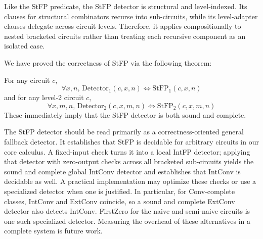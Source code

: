 Like the StFP predicate, the StFP detector is structural and level-indexed. Its clauses for structural combinators recurse into sub-circuits, while its level-adapter clauses delegate across circuit levels. Therefore, it applies compositionally to nested bracketed circuits rather than treating each recursive component as an isolated case.

%

We have proved the correctness of StFP via the following theorem:
\begin{theorem}
    For any circuit $c$,
    \[\forall x,n,\, \text{Detector}_1(c, x, n) \iff \text{StFP}_1(c, x, n)\]
    and for any level-2 circuit $c$,
    \[\forall x,m,n,\, \text{Detector}_2(c, x, m, n) \iff \text{StFP}_2(c, x, m, n)\]
    These immediately imply that the StFP detector is both sound and complete.
\end{theorem}

The StFP detector should be read primarily as a correctness-oriented general fallback detector. It establishes that StFP is decidable for arbitrary circuits in our core calculus. A fixed-input check turns it into a local IntFP detector; applying that detector with zero-output checks across all bracketed sub-circuits yields the sound and complete global IntConv detector and establishes that IntConv is decidable as well. A practical implementation may optimize these checks or use a specialized detector when one is justified. In particular, for Conv-complete classes, IntConv and ExtConv coincide, so a sound and complete ExtConv detector also detects IntConv. FirstZero for the naive and semi-naive circuits is one such specialized detector. Measuring the overhead of these alternatives in a complete system is future work.
